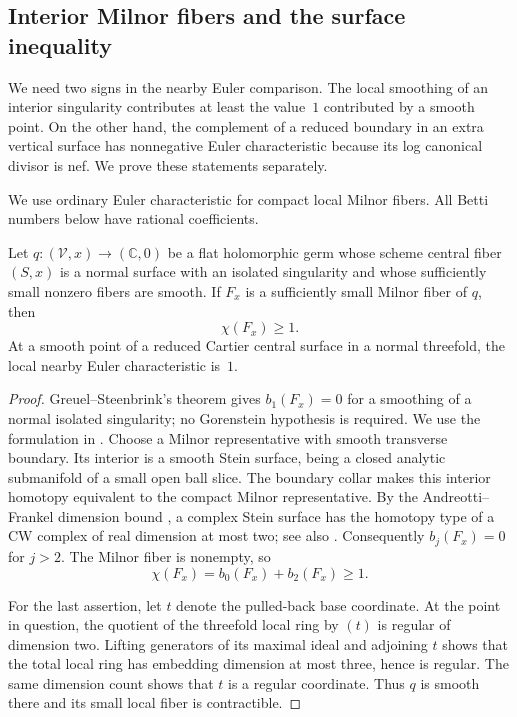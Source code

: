 \subsection{Interior Milnor fibers and the surface inequality}
\label{sec:surface-estimates}

We need two signs in the nearby Euler comparison.  The local smoothing of an
interior singularity contributes at least the value~$1$ contributed by a smooth
point.  On the other hand, the complement of a reduced boundary in an extra
vertical surface has nonnegative Euler characteristic because its log canonical
divisor is nef.  We prove these statements separately.

We use ordinary Euler characteristic for compact local Milnor fibers.
All Betti numbers below have rational coefficients.

\begin{lemma}
\label{lem:interior-correction}
Let $q:(\mathcal V,x)\to(\mathbb C,0)$ be a flat holomorphic germ whose
scheme central fiber $(S,x)$ is a normal surface with an isolated singularity
and whose sufficiently small nonzero fibers are smooth.  If $F_x$ is a
sufficiently small Milnor fiber of $q$, then
\[
  \chi(F_x)\geq 1.
\]
At a smooth point of a reduced Cartier central surface in a normal threefold,
the local nearby Euler characteristic is~$1$.
\end{lemma}

\begin{proof}
Greuel--Steenbrink's theorem \cite{GreuelSteenbrink1983} gives
$b_1(F_x)=0$ for a smoothing of a normal isolated singularity; no
Gorenstein hypothesis is required.  We use the formulation in
\cite[Theorem~2.18]{Greuel2019}.
Choose a Milnor representative with smooth transverse boundary.  Its interior
is a smooth Stein surface, being a closed analytic submanifold of a small
open ball slice.  The boundary collar makes this interior homotopy equivalent
to the compact Milnor representative.  By the Andreotti--Frankel
dimension bound \cite{AndreottiFrankel1959}, a complex Stein surface has
the homotopy type of a CW complex of real dimension at most two; see also
\cite[Theorem~1 and the following remark~(2)]{HillNacinovich1993}.
Consequently $b_j(F_x)=0$ for $j>2$.  The Milnor fiber is nonempty, so
\[
  \chi(F_x)=b_0(F_x)+b_2(F_x)\geq1.
\]

For the last assertion, let $t$ denote the pulled-back base coordinate.
At the point in question, the quotient of the threefold local ring by $(t)$
is regular of dimension two.  Lifting generators of its maximal ideal and
adjoining $t$ shows that the total local ring has embedding dimension at most
three, hence is regular.  The same dimension count shows that $t$ is a regular
coordinate.  Thus $q$ is smooth there and its small local fiber is contractible.
\end{proof}

